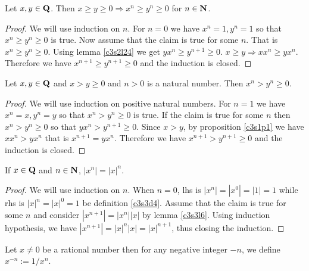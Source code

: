 \begin{lem}\label{c3s3l22}
Let $x, y \in \mathbf{Q}$. Then $x \ge y \ge 0 \Rightarrow x^n \ge y^n \ge 0$
for $n \in \mathbf{N}$.
\end{lem}
\begin{proof}
We will use induction on $n$. For $n = 0$ we have $x^n = 1, y^n = 1$ so 
that $x^n \ge y^n \ge 0$ is true. Now assume that the claim is true for
some $n$. That is $x^n \ge y^n \ge 0$. Using lemma \ref{c3s2l24} we get
$yx^n \ge y^{n+1} \ge 0$. $x \ge y \Rightarrow xx^n \ge yx^n$. Therefore
we have $x^{n+1} \ge y^{n+1} \ge 0$ and the induction is closed.
\end{proof}

\begin{lem}\label{c3s3l23}
Let $x, y \in \mathbf{Q}$ and $x > y \ge 0$ and $n > 0$ is a natural number.
Then $x^n > y^n \ge 0$.
\end{lem}
\begin{proof}
We will use induction on positive natural numbers. For $n=1$ we have $x^n
= x, y^n = y$ so that $x^n > y^n \ge 0$ is true. If the claim is true for
some $n$ then $x^n > y^n \ge 0$ so that $yx^n > y^{n+1} \ge 0$. Since $x > 
y$, by proposition \ref{c3s1p1} we have $xx^n > yx^n$ that is $x^{n+1} = 
yx^n$. Therefore we have $x^{n+1} > y^{n+1} \ge 0$ and the induction is
closed.
\end{proof}

\begin{lem}\label{c3s3l24}
If $x \in \mathbf{Q}$ and $n \in \mathbf{N}$, $|x^n| = |x|^n$.
\end{lem}
\begin{proof}
We will use induction on $n$. When $n=0$, lhs is $|x^n| = |x^0| = |1| = 1$
while rhs is $|x|^n = |x|^0 = 1$ be definition \ref{c3s3d4}. Assume that 
the claim is true for some $n$ and consider $|x^{n+1}| = |x^n||x|$ by 
lemma \ref{c3s3l6}. Using induction hypothesis, we have $|x^{n+1}| = 
|x|^n |x| = |x|^{n+1}$, thus closing the induction.
\end{proof}

\begin{defn}\label{c3s3d5}
Let $x \ne 0$ be a rational number then for any negative integer $-n$, we
define $x^{-n} := 1/x^n$.
\end{defn}

